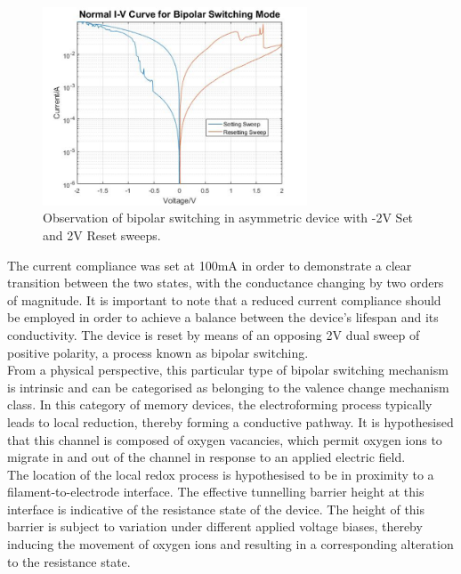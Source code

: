 \begin{figure}[htbp!] 
    \centering    
    \includegraphics[width=0.7\textwidth]{Chapter3/Figs/m.png}
    \caption[Observation of bipolar switching in asymmetric device with -2V Set and 2V Reset sweeps.]{Observation of bipolar switching in asymmetric device with -2V Set and 2V Reset sweeps.}
    \label{fig:3m}
\end{figure}

\noindent The current compliance was set at 100mA in order to demonstrate a clear transition between the two states, with the conductance changing by two orders of magnitude. It is important to note that a reduced current compliance should be employed in order to achieve a balance between the device's lifespan and its conductivity. The device is reset by means of an opposing 2V dual sweep of positive polarity, a process known as bipolar switching.\\


\noindent From a physical perspective, this particular type of bipolar switching mechanism is intrinsic and can be categorised as belonging to the valence change mechanism class. In this category of memory devices, the electroforming process typically leads to local reduction, thereby forming a conductive pathway. It is hypothesised that this channel is composed of oxygen vacancies, which permit oxygen ions to migrate in and out of the channel in response to an applied electric field. \\


\noindent The location of the local redox process is hypothesised to be in proximity to a filament-to-electrode interface. The effective tunnelling barrier height at this interface is indicative of the resistance state of the device. The height of this barrier is subject to variation under different applied voltage biases, thereby inducing the movement of oxygen ions and resulting in a corresponding alteration to the resistance state. \\

